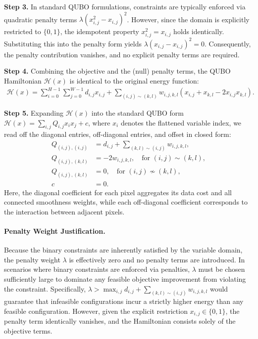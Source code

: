 \documentclass[12pt]{article}
\begin{document}
\textbf{Step 3.} In standard QUBO formulations, constraints are typically enforced via quadratic penalty terms $\lambda (x_{i,j}^2 - x_{i,j})^2$. However, since the domain is explicitly restricted to $\{0,1\}$, the idempotent property $x_{i,j}^2 = x_{i,j}$ holds identically. Substituting this into the penalty form yields $\lambda (x_{i,j} - x_{i,j})^2 = 0$. Consequently, the penalty contribution vanishes, and no explicit penalty terms are required.

\textbf{Step 4.} Combining the objective and the (null) penalty terms, the QUBO Hamiltonian $\mathcal{H}(x)$ is identical to the original energy function:
\begin{align}
\mathcal{H}(x) = \sum_{i=0}^{H-1} \sum_{j=0}^{W-1} d_{i,j} x_{i,j} + \sum_{(i,j) \sim (k,l)} w_{i,j,k,l} (x_{i,j} + x_{k,l} - 2 x_{i,j} x_{k,l}).
\end{align}

\textbf{Step 5.} Expanding $\mathcal{H}(x)$ into the standard QUBO form $\mathcal{H}(x) = \sum_{i,j} Q_{i,j} x_i x_j + c$, where $x_i$ denotes the flattened variable index, we read off the diagonal entries, off-diagonal entries, and offset in closed form:
\begin{align}
Q_{(i,j),(i,j)} &= d_{i,j} + \sum_{(k,l) \sim (i,j)} w_{i,j,k,l}, \\
Q_{(i,j),(k,l)} &= -2 w_{i,j,k,l}, \quad \text{for } (i,j) \sim (k,l), \\
Q_{(i,j),(k,l)} &= 0, \quad \text{for } (i,j) \not\sim (k,l), \\
c &= 0.
\end{align}
Here, the diagonal coefficient for each pixel aggregates its data cost and all connected smoothness weights, while each off-diagonal coefficient corresponds to the interaction between adjacent pixels.

\paragraph{Penalty Weight Justification.}
Because the binary constraints are inherently satisfied by the variable domain, the penalty weight $\lambda$ is effectively zero and no penalty terms are introduced. In scenarios where binary constraints are enforced via penalties, $\lambda$ must be chosen sufficiently large to dominate any feasible objective improvement from violating the constraint. Specifically, $\lambda > \max_{i,j} d_{i,j} + \sum_{(k,l)\sim(i,j)} w_{i,j,k,l}$ would guarantee that infeasible configurations incur a strictly higher energy than any feasible configuration. However, given the explicit restriction $x_{i,j} \in \{0,1\}$, the penalty term identically vanishes, and the Hamiltonian consists solely of the objective terms.
\end{document}
